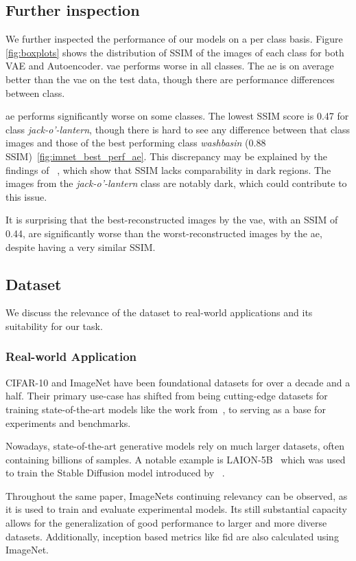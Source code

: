 \subsection{Further inspection}
We further inspected the performance of our models on a per class basis. Figure \ref{fig:boxplots} shows the distribution of SSIM of the images of each class for both VAE and Autoencoder. \ac{vae} performs worse in all classes. The \ac{ae} is on average better than the \ac{vae} on the test data, though there are performance differences between class. 

\ac{ae} performs significantly worse on some classes.
The lowest SSIM score is 0.47 for class \textit{jack-o'-lantern}, though there is
hard to see any difference between that class images and those of the best performing class
\textit{washbasin} (0.88 SSIM)~\ref{fig:imnet_best_perf_ae}.
This discrepancy may be explained by the findings of ~\cite{understandingssim}, which show that SSIM lacks
comparability in dark regions. The images from the \textit{jack-o'-lantern} class are notably dark, which could contribute to this issue.

It is surprising that the best-reconstructed images by the \ac{vae}, with an SSIM of 0.44, are significantly worse than the worst-reconstructed images by the \ac{ae}, despite having a very similar SSIM.

\subsection{Dataset}\label{subsec:dataset}
We discuss the relevance of the dataset to real-world applications and its suitability for our task.
\subsubsection{Real-world Application}
CIFAR-10 and ImageNet have been foundational datasets for over a decade and a half.
Their primary use-case has shifted from being cutting-edge datasets for training state-of-the-art models like the
work from~\cite{AlexNet}, to serving as a base for experiments and benchmarks.

Nowadays, state-of-the-art generative models rely on much larger datasets, often containing billions of samples.
A notable example is LAION-5B~\cite{laion5b} which was used to train the Stable Diffusion model introduced by~
\cite{stable_diff}.

Throughout the same paper, ImageNets continuing relevancy can be observed, as it is used to train and evaluate
experimental models.
Its still substantial capacity allows for the generalization of good performance to larger and more diverse datasets.
Additionally, inception based metrics like \ac{fid} are also calculated using ImageNet.

